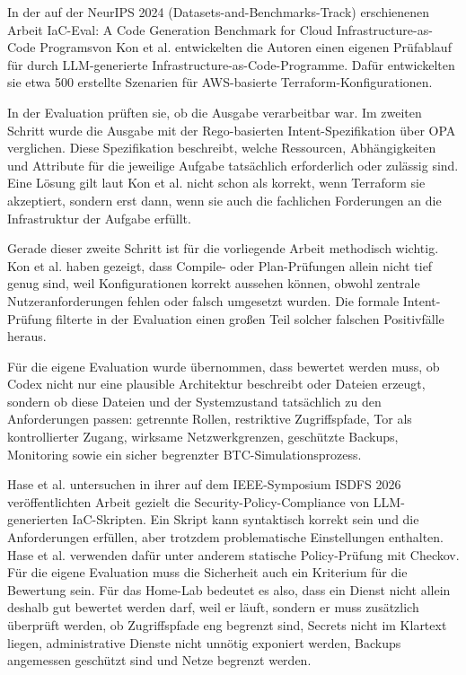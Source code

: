 In der auf der NeurIPS 2024 (Datasets-and-Benchmarks-Track) erschienenen Arbeit \glqq \ac{IaC}-Eval: A Code Generation Benchmark for Cloud Infrastructure-as-Code Programs\grqq von Kon et al. entwickelten die Autoren einen eigenen Prüfablauf für durch \ac{LLM}-generierte Infrastructure-as-Code-Programme. Dafür entwickelten sie etwa 500 erstellte Szenarien für \ac{AWS}-basierte Terraform-Konfigurationen.

In der Evaluation prüften sie, ob die Ausgabe verarbeitbar war. Im zweiten Schritt wurde die Ausgabe mit der Rego-basierten Intent-Spezifikation über \acf{OPA} verglichen. Diese Spezifikation beschreibt, welche Ressourcen, Abhängigkeiten und Attribute für die jeweilige Aufgabe tatsächlich erforderlich oder zulässig sind. Eine Lösung gilt laut Kon et al. nicht schon als korrekt, wenn Terraform sie akzeptiert, sondern erst dann, wenn sie auch die fachlichen Forderungen an die Infrastruktur der Aufgabe erfüllt.\cite{kon2024iaceval}

Gerade dieser zweite Schritt ist für die vorliegende Arbeit methodisch wichtig. Kon et al. haben gezeigt, dass Compile- oder Plan-Prüfungen allein nicht tief genug sind, weil Konfigurationen korrekt aussehen können, obwohl zentrale Nutzeranforderungen fehlen oder falsch umgesetzt wurden. Die formale Intent-Prüfung filterte in der Evaluation einen großen Teil solcher falschen Positivfälle heraus.

Für die eigene Evaluation wurde übernommen, dass bewertet werden muss, ob Codex nicht nur eine plausible Architektur beschreibt oder Dateien erzeugt, sondern ob diese Dateien und der Systemzustand tatsächlich zu den Anforderungen passen: getrennte Rollen, restriktive Zugriffspfade, Tor als kontrollierter Zugang, wirksame Netzwerkgrenzen, geschützte Backups, Monitoring sowie ein sicher begrenzter \ac{BTC}-Simulationsprozess.

Hase et al. untersuchen in ihrer auf dem IEEE-Symposium ISDFS 2026 veröffentlichten Arbeit gezielt die Security-Policy-Compliance von \ac{LLM}-generierten \acs{IaC}-Skripten. Ein Skript kann syntaktisch korrekt sein und die Anforderungen erfüllen, aber trotzdem problematische Einstellungen enthalten. Hase et al. verwenden dafür unter anderem statische Policy-Prüfung mit Checkov.\cite{hase2026securitypolicyiac} Für die eigene Evaluation muss die Sicherheit auch ein Kriterium für die Bewertung sein. Für das Home-Lab bedeutet es also, dass ein Dienst nicht allein deshalb gut bewertet werden darf, weil er läuft, sondern er muss zusätzlich überprüft werden, ob Zugriffspfade eng begrenzt sind, Secrets nicht im Klartext liegen, administrative Dienste nicht unnötig exponiert werden, Backups angemessen geschützt sind und Netze begrenzt werden.


